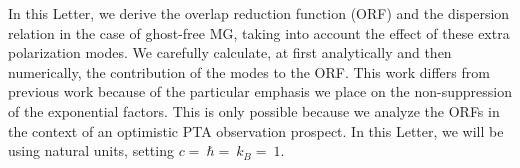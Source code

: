 \documentclass[prd,twocolumn,aps,psfig,nofootinbib,nobibnotes,superscriptaddress,preprintnumbers,times]{revtex4-2}
\begin{document}
In this Letter, we derive the overlap reduction function (ORF) and the dispersion relation in the case of ghost-free MG, taking into account the effect of these extra polarization modes. We carefully calculate, at first analytically and then numerically, the contribution of the modes to the ORF.
This work differs from previous work \cite{Liang:2021bct, Anholm:2008wy, Arjona:2024cex, Lee:2013awh} because of the particular emphasis we place on the non-suppression of the exponential factors. This is only possible because we analyze the ORFs in the context of an optimistic PTA observation prospect. In this Letter, we will be using natural units, setting $c = $$\ \hbar = $$\ k_B = $$\ 1$.

\end{document}
